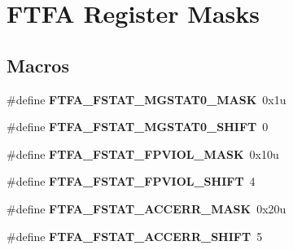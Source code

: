 \hypertarget{group___f_t_f_a___register___masks}{}\section{F\+T\+F\+A Register Masks}
\label{group___f_t_f_a___register___masks}
\subsection*{Macros}
\begin{DoxyCompactItemize}
\item 
\hypertarget{group___f_t_f_a___register___masks_ga56163f418850b05a9fb528e94bbc026e}{}\#define {\bfseries F\+T\+F\+A\+\_\+\+F\+S\+T\+A\+T\+\_\+\+M\+G\+S\+T\+A\+T0\+\_\+\+M\+A\+S\+K}~0x1u\label{group___f_t_f_a___register___masks_ga56163f418850b05a9fb528e94bbc026e}

\item 
\hypertarget{group___f_t_f_a___register___masks_ga61b25328b4e91259c518051ad485c9e1}{}\#define {\bfseries F\+T\+F\+A\+\_\+\+F\+S\+T\+A\+T\+\_\+\+M\+G\+S\+T\+A\+T0\+\_\+\+S\+H\+I\+F\+T}~0\label{group___f_t_f_a___register___masks_ga61b25328b4e91259c518051ad485c9e1}

\item 
\hypertarget{group___f_t_f_a___register___masks_ga371bc7284b6d2e14f852e4e7e0316fef}{}\#define {\bfseries F\+T\+F\+A\+\_\+\+F\+S\+T\+A\+T\+\_\+\+F\+P\+V\+I\+O\+L\+\_\+\+M\+A\+S\+K}~0x10u\label{group___f_t_f_a___register___masks_ga371bc7284b6d2e14f852e4e7e0316fef}

\item 
\hypertarget{group___f_t_f_a___register___masks_ga92718795ccbab208784ed798d252567e}{}\#define {\bfseries F\+T\+F\+A\+\_\+\+F\+S\+T\+A\+T\+\_\+\+F\+P\+V\+I\+O\+L\+\_\+\+S\+H\+I\+F\+T}~4\label{group___f_t_f_a___register___masks_ga92718795ccbab208784ed798d252567e}

\item 
\hypertarget{group___f_t_f_a___register___masks_gaf7824945e3224ae270302e23286e9e34}{}\#define {\bfseries F\+T\+F\+A\+\_\+\+F\+S\+T\+A\+T\+\_\+\+A\+C\+C\+E\+R\+R\+\_\+\+M\+A\+S\+K}~0x20u\label{group___f_t_f_a___register___masks_gaf7824945e3224ae270302e23286e9e34}

\item 
\hypertarget{group___f_t_f_a___register___masks_ga3bbe94d5c4203cd6eebe9e0e78f555aa}{}\#define {\bfseries F\+T\+F\+A\+\_\+\+F\+S\+T\+A\+T\+\_\+\+A\+C\+C\+E\+R\+R\+\_\+\+S\+H\+I\+F\+T}~5\label{group___f_t_f_a___register___masks_ga3bbe94d5c4203cd6eebe9e0e78f555aa}


\end{DoxyCompactItemize}

